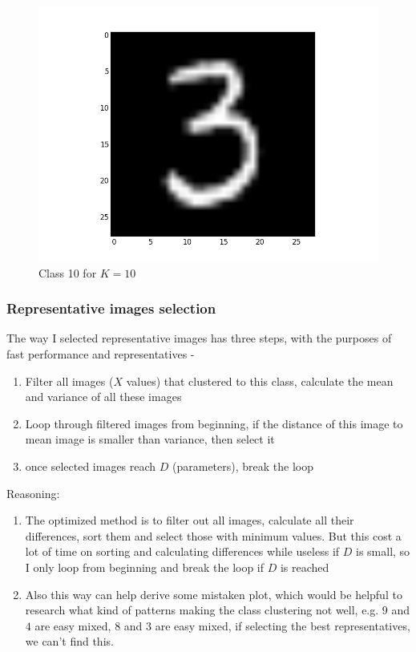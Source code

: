 \documentclass[submit]{harvardml}
\begin{document}
\begin{figure}[ht]
    \includegraphics[scale=0.20]{representative-9-2}
    \caption{Class 10 for $K=10$}
\end{figure}

\subsubsection*{Representative images selection}

The way I selected representative images has three steps, with the purposes of fast performance and representatives -

\begin{enumerate}
    \item Filter all images ($X$ values) that clustered to this class, calculate the mean and variance of all these images
    \item Loop through filtered images from beginning, if the distance of this image to mean image is smaller than variance, then select it
    \item once selected images reach $D$ (parameters), break the loop
\end{enumerate}

Reasoning: 
\begin{enumerate}
    \item The optimized method is to filter out all images, calculate all their differences, sort them and select those with minimum values. But this cost a lot of time on sorting and calculating differences while useless if $D$ is small, so I only loop from beginning and break the loop if $D$ is reached
    \item Also this way can help derive some mistaken plot, which would be helpful to research what kind of patterns making the class clustering not well, e.g. $9$ and $4$ are easy mixed, $8$ and $3$ are easy mixed, if selecting the best representatives, we can't find this.
\end{enumerate}
\end{document}

